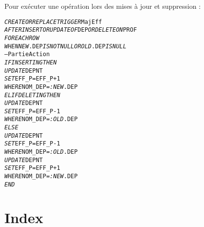 \documentclass[10pt]{article}
\begin{document}
                Pour exécuter une opération lors des mises à jour et suppression :
                \begin{alltt}
                    \begin{tabbing}
                        \emph{CREATE OR REPLACE TRIGGER} MajEff\\
                        \emph{AFTER INSERT OR UPDATE OF} DEP \emph{OR DELETE ON} PROF\\
                        \emph{FOR EACH ROW}\\
                        \emph{WHEN NEW}.DEP \emph{IS NOT NULL OR OLD}.DEP \emph{IS NULL}\\
                        -- Partie Action\\
                        \emph{IF}\=\emph{INSERTING THEN}\\
                            \>\emph{UPDATE} DEPNT\\
                            \>\emph{SET} EFF_P=EFF_P+1\\
                            \>\emph{WHERE} NOM_DEP=\emph{:NEW}.DEP\\
                        \emph{ELIF}\=\emph{DELETING THEN}\\
                            \>\emph{UPDATE} DEPNT\\
                            \>\emph{SET} EFF_P=EFF_P-1\\
                            \>\emph{WHERE} NOM_DEP=\emph{:OLD}.DEP\\
                        \emph{ELSE}\=\\
                            \>\emph{UPDATE} DEPNT\\
                            \>\emph{SET} EFF_P=EFF_P-1\\
                            \>\emph{WHERE} NOM_DEP=\emph{:OLD}.DEP\\
                            \>\emph{UPDATE} DEPNT\\
                            \>\emph{SET} EFF_P=EFF_P+1\\
                            \>\emph{WHERE} NOM_DEP=\emph{:NEW}.DEP\\
                        \emph{END}
                    \end{tabbing}
                \end{alltt}
\newpage
\part*{Index}
\tableofcontents
\newpage
\listoftables
\listoffigures
\renewcommand{\indexname}{Liste des mots-clefs PL/SQL} \printindex
\end{document}
